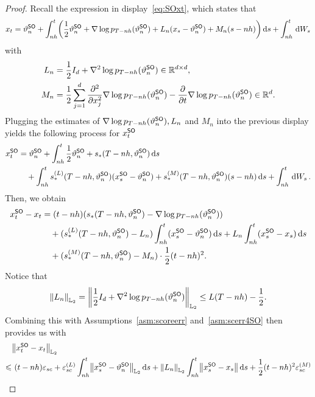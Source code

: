\begin{proof}
Recall the expression in display~\eqref{eq:SOxt}, which states that
\begin{align*}
    x_t=\vartheta_n^{\sf SO}+\int_{nh}^{t}\left(\dfrac{1}{2}\vartheta_n^{\sf SO}+\nabla \log p_{T-nh}(\vartheta_n^{\sf SO})+L_n(x_s-\vartheta_n^{\sf SO})+M_n(s-nh)\right)\rmd s+\int_{nh}^{t}\rmd W_s
\end{align*}
with
\begin{align*}
    L_n&=\dfrac{1}{2}I_d+\nabla^2\log p_{T-nh}(\vartheta_n^{\sf SO})\in\mathbb{R}^{d\times d},\\
    M_n&=\dfrac{1}{2}\sum_{j=1}^d\dfrac{\partial^2}{\partial x_j^2}\nabla\log p_{T-nh}(\vartheta_n^{\sf SO})-\dfrac{\partial}{\partial t}\nabla\log p_{T-nh}(\vartheta_n^{\sf SO})\in\mathbb{R}^d.
\end{align*}
Plugging the estimates of $\nabla \log p_{T-nh}(\vartheta_n^{\sf SO}),L_n$ and $M_n$ into the previous display yields the following process for $x_t^{\sf SO}$ 
\begin{align*}
    x_t^{\sf SO}&=\vartheta_n^{\sf SO}+\int_{nh}^t\dfrac{1}{2}\vartheta_n^{\sf SO}+s_*(T-nh,\vartheta_n^{\sf SO}){\,\rm d} s\\
    &\quad +\int_{nh}^ts_*^{(L)}(T-nh,\vartheta_n^{\sf SO})(x_s^{\sf SO}-\vartheta_n^{\sf SO})+s_*^{(M)}(T-nh,\vartheta_n^{\sf SO})(s-nh){\,\rm d} s+\int_{nh}^t{\,\rm d} W_s\,.
\end{align*}
Then, we obtain 
\begin{align*}
    x_t^{\sf SO}-x_t&=(t-nh)(s_*(T-nh,\vartheta_n^{\sf SO})-\nabla\log p_{T-nh}(\vartheta_n^{\sf SO}))\\
    &\quad +(s_*^{(L)}(T-nh,\vartheta_n^{\sf SO})-L_n)\int_{nh}^t(x_s^{\sf SO}-\vartheta_n^{\sf SO}){\,\rm d} s+L_n\int_{nh}^t(x_s^{\sf SO}-x_s){\,\rm d} s\\
    &\quad +(s_*^{(M)}(T-nh,\vartheta_n^{\sf SO})-M_n)\cdot\dfrac{1}{2}(t-nh)^2.
\end{align*}
Notice that
\begin{align}
    \label{eq:SOterm1}
    \l|L_n\r|_{\Ltwo}=\l|\dfrac{1}{2}I_d+\nabla^2\log p_{T-nh}(\vartheta_n^{\sf SO})\r|_{\Ltwo}\leq L(T-nh)-\dfrac{1}{2}.
\end{align}
Combining this with  Assumptions~\ref{asm:scoreerr} and~\ref{asm:scerr4SO} then provides us with
\begin{align*}
    &\l|x_t^{\sf SO}-x_t\r|_{\Ltwo}\\
    \leqslant&\,\, (t-nh)\varepsilon_{sc}+\varepsilon_{sc}^{(L)}\int_{nh}^t\l|x_s^{\sf SO}-\vartheta_n^{\sf SO}\r|_{\Ltwo}\rmd s+\l|L_n\r|_{\Ltwo}\int_{nh}^t\l|x_s^{\sf SO}-x_s\r|\rmd s+\dfrac{1}{2}(t-nh)^2\varepsilon_{sc}^{(M)}\\

\end{align*}
\end{proof}
